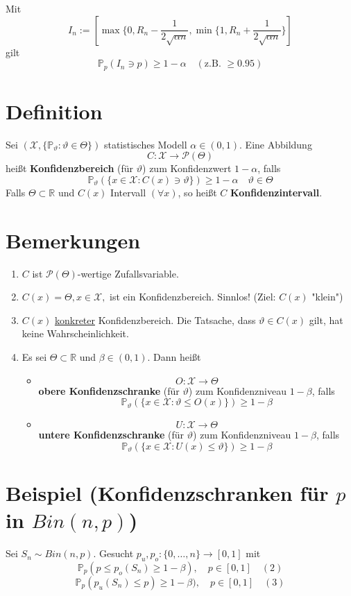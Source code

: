 \documentclass[a4paper,11pt,notitlepage]{report}
\newcommand{\R}{{\ensuremath{\mathbb{R}}}}
\newcommand{\Prim}{{\ensuremath{\mathbb{P}}}}
\begin{document}
Mit 
$$I_n := [\max\{0, R_n - \frac{1}{2 \sqrt{\alpha n}}, \min \{1, R_n + \frac{1}{2 \sqrt{\alpha n}}\}]$$
gilt
$$\Prim_p(I_n \ni p) \geq 1 - \alpha \quad (\text{z.B. } \geq 0.95)$$

\section{Definition}
Sei $(\mathcal{X}, \{\Prim_\vartheta \colon \vartheta \in \Theta \})$ statistisches Modell
\newline
$\alpha \in (0,1)$. Eine Abbildung 
$$C \colon \mathcal{X} \rightarrow \mathcal{P}(\Theta)$$ heißt \textbf{Konfidenzbereich} (für $\vartheta$) zum Konfidenzwert $1- \alpha$, falls
$$\Prim_\vartheta(\{x \in \mathcal{X} \colon C(x) \ni \vartheta\}) \geq 1- \alpha \quad
\vartheta \in \Theta$$
Falls $\Theta \subset \R$ und $C(x)$ Intervall $(\forall x)$, so heißt $C$ \textbf{Konfidenzintervall}.

\section{Bemerkungen}
\begin{enumerate}
	\item $C$ ist $\mathcal{P}(\Theta)$-wertige Zufallsvariable. 
	\item $C(x) = \Theta, x \in \mathcal{X},$ ist ein Konfidenzbereich. Sinnlos! (Ziel: $C(x)$ "klein")
	\item $C(x)$ \underline{konkreter} Konfidenzbereich. Die Tatsache, dass $\vartheta \in C(x)$ gilt, hat keine Wahrscheinlichkeit.
	\item Es sei $\Theta \subset \R$ und $\beta \in (0,1)$. Dann heißt
	\begin{itemize}
	\item
	$$O \colon \mathcal{X} \rightarrow \Theta$$ \textbf{obere Konfidenzschranke} (für $\vartheta$) zum Konfidenzniveau $1- \beta$, falls
	$$\Prim_\vartheta(\{x \in \mathcal{X} \colon \vartheta \leq O(x)\}) \geq 1- \beta$$
	\item 
	$$U \colon \mathcal{X} \rightarrow \Theta$$ \textbf{untere Konfidenzschranke} (für $\vartheta$) zum Konfidenzniveau $1- \beta$, falls
	$$\Prim_\vartheta(\{x \in \mathcal{X} \colon U(x) \leq \vartheta \}) \geq 1- \beta$$
	\end{itemize}
\end{enumerate}

\section{Beispiel (Konfidenzschranken für $p$ in $Bin(n,p)$)}
	Sei $S_n \sim Bin(n,p)$. Gesucht $p_u, p_o \colon \{0, \ldots, n\} \rightarrow [0,1]$ mit
	$$\Prim_p(p \leq p_o(S_n) \geq 1 - \beta), \quad p \in [0,1] \quad (2)$$
	$$\Prim_p(p_u(S_n) \leq p) \geq 1- \beta), \quad p \in [0,1] \quad (3)$$
	
\end{document}
